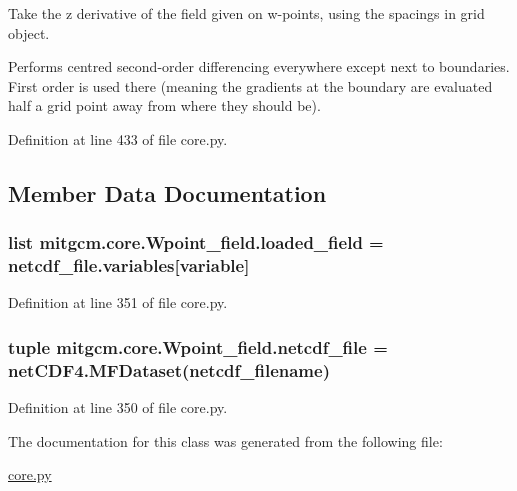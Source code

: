 Take the z derivative of the field given on w-\/points, using the spacings in grid object. 

Performs centred second-\/order differencing everywhere except next to boundaries. First order is used there (meaning the gradients at the boundary are evaluated half a grid point away from where they should be). 

Definition at line 433 of file core.\+py.



\subsection{Member Data Documentation}
\hypertarget{classmitgcm_1_1core_1_1Wpoint__field_acfbb89a604280097ac640e55edc60d21}{
\subsubsection[{loaded\+\_\+field}]{\setlength{\rightskip}{0pt plus 5cm}list mitgcm.\+core.\+Wpoint\+\_\+field.\+loaded\+\_\+field = netcdf\+\_\+file.\+variables\mbox{[}variable\mbox{]}\hspace{0.3cm}{\ttfamily [static]}}}\label{classmitgcm_1_1core_1_1Wpoint__field_acfbb89a604280097ac640e55edc60d21}


Definition at line 351 of file core.\+py.

\hypertarget{classmitgcm_1_1core_1_1Wpoint__field_af9c1d07b6f48ca4ea7fc11f766b406b6}{
\subsubsection[{netcdf\+\_\+file}]{\setlength{\rightskip}{0pt plus 5cm}tuple mitgcm.\+core.\+Wpoint\+\_\+field.\+netcdf\+\_\+file = net\+C\+D\+F4.\+M\+F\+Dataset(netcdf\+\_\+filename)\hspace{0.3cm}{\ttfamily [static]}}}\label{classmitgcm_1_1core_1_1Wpoint__field_af9c1d07b6f48ca4ea7fc11f766b406b6}


Definition at line 350 of file core.\+py.



The documentation for this class was generated from the following file\+:\begin{DoxyCompactItemize}
\item 
\hyperlink{core_8py}{core.\+py}\end{DoxyCompactItemize}
